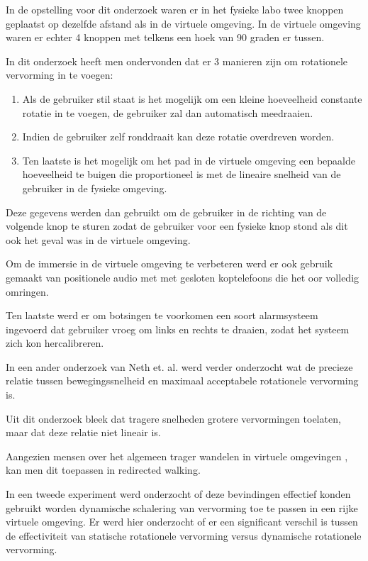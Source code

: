 \documentclass[a4paper,12pt]{article}
\begin{document}
In de opstelling voor dit onderzoek waren er in het fysieke labo twee knoppen
geplaatst op dezelfde afstand als in de virtuele omgeving. In de virtuele
omgeving waren er echter 4 knoppen met telkens een hoek van 90 graden er tussen.

In dit onderzoek heeft men ondervonden dat er 3 manieren zijn om rotationele
vervorming in te voegen:

\begin{enumerate}
    \item Als de gebruiker stil staat is het mogelijk om een kleine hoeveelheid
        constante rotatie in te voegen, de gebruiker zal dan automatisch
        meedraaien.
    \item Indien de gebruiker zelf ronddraait kan deze rotatie overdreven worden.
    \item Ten laatste is het mogelijk om het pad in de virtuele omgeving een
        bepaalde hoeveelheid te buigen die proportioneel is met de lineaire
        snelheid van de gebruiker in de fysieke omgeving.
\end{enumerate}

Deze gegevens werden dan gebruikt om de gebruiker in de richting van de volgende
knop te sturen zodat de gebruiker voor een fysieke knop stond als dit ook het
geval was in de virtuele omgeving.

Om de immersie in de virtuele omgeving te verbeteren werd er ook gebruik gemaakt
van positionele audio met met gesloten koptelefoons die het oor volledig omringen.

Ten laatste werd er om botsingen te voorkomen een soort alarmsysteem ingevoerd
dat gebruiker vroeg om links en rechts te draaien, zodat het systeem zich kon 
hercalibreren.

In een ander onderzoek van Neth et. al.\cite{neth12} werd verder onderzocht wat
de precieze relatie tussen bewegingssnelheid en maximaal acceptabele rotationele
vervorming is.

Uit dit onderzoek bleek dat tragere snelheden grotere vervormingen toelaten, maar
dat deze relatie niet lineair is.

Aangezien mensen over het algemeen trager wandelen in virtuele omgevingen
\cite{mohler07}, kan men dit toepassen in redirected walking.

In een tweede experiment\cite{neth12} werd onderzocht of deze bevindingen
effectief konden gebruikt worden dynamische schalering van vervorming toe te
passen in een rijke virtuele omgeving. Er werd hier onderzocht of er een
significant verschil is tussen de effectiviteit van statische rotationele
vervorming versus dynamische rotationele vervorming.
\end{document}

